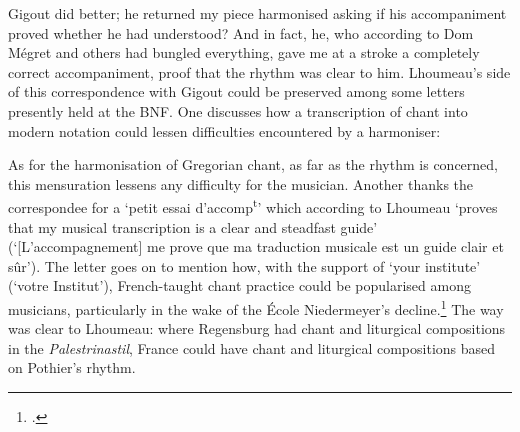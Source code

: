   {\label{n:gigout}}
{Gigout did better; he returned my piece harmonised asking if his accompaniment proved whether he had understood? And in fact, he, who according to Dom Mégret and others had bungled everything, gave me at a stroke a completely correct accompaniment, proof that the rhythm was clear to him.}
\noindent
Lhoumeau's side of this correspondence with Gigout could be preserved among some letters presently held at the BNF.
One discusses how a transcription of chant into modern notation could lessen  difficulties encountered by a harmoniser:

  {}
{As for the harmonisation of Gregorian chant, as far as the rhythm is concerned, this mensuration lessens any difficulty for the musician.}
\noindent
Another thanks the correspondee for a `petit essai d'accomp\textsuperscript{t}' which according to Lhoumeau `proves that my musical transcription is a clear and steadfast guide' (`[L'accompagnement] me prove que ma traduction musicale est un guide clair et sûr').
The letter goes on to mention how, with the support of `your institute' (`votre Institut'), French-taught chant practice could be popularised among musicians, particularly in the wake of the École Niedermeyer's decline.\footnote{.}
The way was clear to Lhoumeau: where Regensburg had chant and liturgical compositions in the \emph{Palestrinastil}, France could have chant and liturgical compositions based on Pothier's rhythm.

